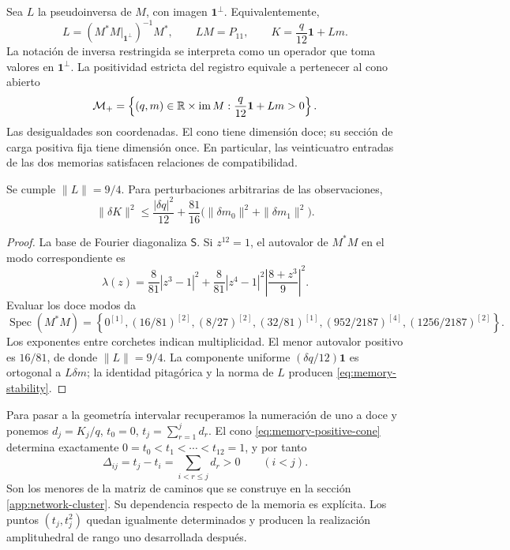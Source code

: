 Sea \(L\) la pseudoinversa de \(M\), con imagen
\(\mathbf1^\perp\). Equivalentemente,
\[
 L=\left(M^*M\big|_{\mathbf1^\perp}\right)^{-1}M^*,
 \qquad LM=P_{11},\qquad K=\frac q{12}\mathbf1+Lm.
\]
La notación de inversa restringida se interpreta como un operador que toma
valores en \(\mathbf1^\perp\). La positividad estricta del registro
equivale a pertenecer al cono abierto
\begin{equation}
 \mathcal M_+=\left\{(q,m)\in\mathbb R\times\operatorname{im}M:
 \frac q{12}\mathbf1+Lm>0\right\}.
 \label{eq:memory-positive-cone}
\end{equation}
Las desigualdades son coordenadas. El cono tiene dimensión doce; su sección
de carga positiva fija tiene dimensión once. En particular, las veinticuatro
entradas de las dos memorias satisfacen relaciones de compatibilidad.

\begin{proposition}
\label{prop:memory-stability}
Se cumple \(\|L\|=9/4\). Para perturbaciones arbitrarias de las observaciones,
\begin{equation}
 \|\delta K\|^2\leq\frac{|\delta q|^2}{12}
 +\frac{81}{16}\bigl(\|\delta m_0\|^2+\|\delta m_1\|^2\bigr).
 \label{eq:memory-stability}
\end{equation}
\end{proposition}
\begin{proof}
La base de Fourier diagonaliza \(\mathsf S\). Si \(z^{12}=1\),
el autovalor de \(M^*M\) en el modo correspondiente es
\[
 \lambda(z)=\frac8{81}|z^3-1|^2
 +\frac8{81}|z^4-1|^2\left|\frac{8+z^3}{9}\right|^2.
\]
Evaluar los doce modos da
\[
 \operatorname{Spec}(M^*M)=
 \left\{0^{[1]},(16/81)^{[2]},(8/27)^{[2]},(32/81)^{[1]},
 (952/2187)^{[4]},(1256/2187)^{[2]}\right\}.
\]
Los exponentes entre corchetes indican multiplicidad. El menor autovalor
positivo es \(16/81\), de donde \(\|L\|=9/4\). La componente uniforme
\((\delta q/12)\mathbf1\) es ortogonal a \(L\delta m\); la identidad
pitagórica y la norma de \(L\) producen \eqref{eq:memory-stability}.
\end{proof}

Para pasar a la geometría intervalar recuperamos la numeración de uno a doce
y ponemos \(d_j=K_j/q\), \(t_0=0\),
\(t_j=\sum_{r=1}^j d_r\). El cono \eqref{eq:memory-positive-cone}
determina exactamente \(0=t_0<t_1<\cdots<t_{12}=1\), y por tanto
\[
 \Delta_{ij}=t_j-t_i=\sum_{i<r\leq j}d_r>0\qquad(i<j).
\]
Son los menores de la matriz de caminos que se construye en la sección
\ref{app:network-cluster}. Su dependencia respecto de la memoria es
explícita. Los puntos \((t_j,t_j^2)\) quedan igualmente determinados y
producen la realización amplituhedral de rango uno desarrollada después.

